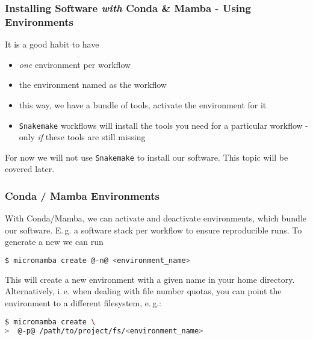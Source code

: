 \begin{frame}
  \frametitle{Installing Software \emph{with} Conda \& Mamba - Using Environments}
  \begin{hint}It is a good habit to have
        \begin{itemize}
          \item \emph{one} environment per workflow
          \item the environment named as the workflow
          \item this way, we have a bundle of tools, activate the environment for it
          \item \texttt{Snakemake} workflows will install the tools you need for a particular workflow - only \emph{if} these tools are still missing
         \end{itemize}
  \end{hint}
  \begin{hint}[Note]
  	For now we will not use \texttt{Snakemake} to install our software. This topic will be covered later.
  \end{hint}
\end{frame}

\begin{frame}[fragile]
  \frametitle{Conda / Mamba Environments}
  With Conda/Mamba, we can activate and deactivate environments, which bundle our software. E.\,g. a software stack per workflow to ensure reproducible runs.
    \pause
  To generate a new we can run
  \begin{lstlisting}[language=Bash, style=Shell]
$ micromamba create @-n@ <environment_name>
  \end{lstlisting}
  This will create a new environment with a given name in your home directory. Alternatively, i.\,e. when dealing with file number quotas, you can point the environment to a different filesystem, e.\,g.:
  \begin{lstlisting}[language=Bash, style=Shell] 
$ micromamba create \
>  @-p@ /path/to/project/fs/<environment_name>
   \end{lstlisting}
\end{frame}

